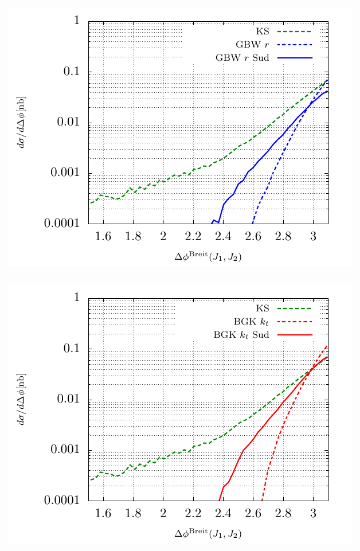\documentclass[11pt]{article}
\numberwithin{equation}{section}
\numberwithin{table}{section}
\numberwithin{figure}{section}
\begin{document}
\begin{figure}[p]
\begin{subfigure}{0.48\textwidth}
	\end{subfigure}
	\begin{subfigure}{0.48\textwidth}
		\includegraphics[width=\textwidth]{plots/plotGBW3Jets}
	\end{subfigure}
	\begin{subfigure}{0.48\textwidth}
		\includegraphics[width=\textwidth]{plots/plotBGK2Jets}
	\end{subfigure}
	\begin{subfigure}{0.48\textwidth}

\end{subfigure}
\end{figure}
\end{document}
